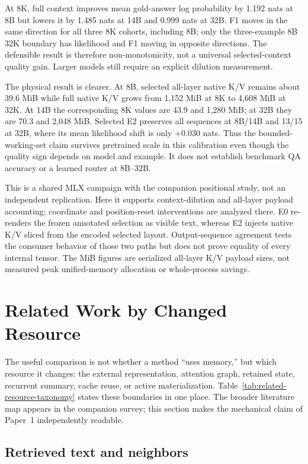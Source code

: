 \documentclass[11pt]{article}
\begin{document}
At 8K, full context improves mean gold-answer log probability by 1.192 nats at 8B but lowers
it by 1.485 nats at 14B and 0.999 nats at 32B. F1 moves in the same direction for all three
8K cohorts, including 8B; only the three-example 8B 32K boundary has likelihood and F1 moving
in opposite directions. The defensible result is therefore non-monotonicity, not a universal
selected-context quality gain. Larger models still require an explicit dilution measurement.

The physical result is clearer. At 8B, selected all-layer native K/V remains about 39.6 MiB
while full native K/V grows from 1,152 MiB at 8K to 4,608 MiB at 32K. At 14B the corresponding
8K values are 43.9 and 1,280 MiB; at 32B they are 70.3 and 2,048 MiB. Selected E2 preserves all
sequences at 8B/14B and 13/15 at 32B, where its mean likelihood shift is only $+0.030$ nats.
Thus the bounded-working-set claim survives pretrained scale in this calibration even though
the quality sign depends on model and example. It does not establish benchmark QA accuracy
or a learned router at 8B--32B.

This is a shared MLX campaign with the companion positional study, not an independent
replication. Here it supports context-dilution and all-layer payload accounting; coordinate
and position-reset interventions are analyzed there. E0 re-renders the frozen annotated
selection as visible text, whereas E2 injects native K/V sliced from the encoded selected
layout. Output-sequence agreement tests the consumer behavior of those two paths but does
not prove equality of every internal tensor. The MiB figures are serialized all-layer K/V
payload sizes, not measured peak unified-memory allocation or whole-process savings.

\section{Related Work by Changed Resource}

The useful comparison is not whether a method ``uses memory,'' but which resource it changes:
the external representation, attention graph, retained state, recurrent summary, cache reuse,
or active materialization. Table~\ref{tab:related-resource-taxonomy} states these boundaries in
one place. The broader literature map appears in the companion survey; this section makes the
mechanical claim of Paper~1 independently readable.

\subsection{Retrieved text and neighbors}
\end{document}
